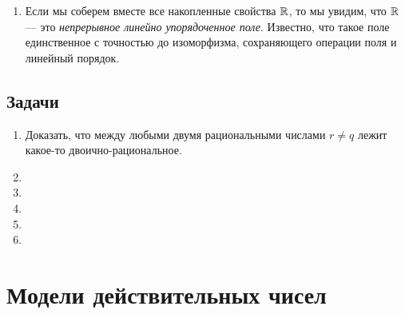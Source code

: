 \begin{enumerate}
\item Если мы соберем вместе все накопленные свойства $\mathbb R$, то мы увидим, что $\mathbb R$ --- это \textit{непрерывное линейно упорядоченное поле}. Известно, что такое поле единственное с точностью до изоморфизма, сохраняющего  операции поля и линейный порядок.

\end{enumerate}


\subsection*{Задачи}
\begin{enumerate}
\item Доказать, что между любыми двумя рациональными числами $r\ne q$ лежит какое-то двоично-рациональное.
\item 
\item 
\item 
\item 
\item 
\end{enumerate}


\section{Модели действительных чисел}

